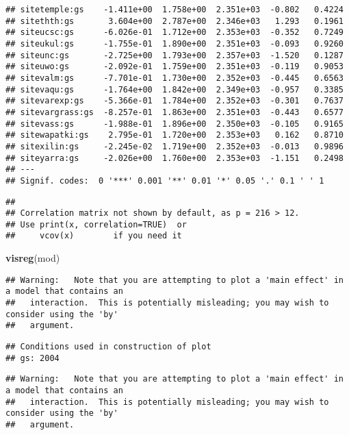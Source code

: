 \documentclass[
]{article}
\newenvironment{Shaded}{\begin{snugshade}}{\end{snugshade}}
\newcommand{\KeywordTok}[1]{\textcolor[rgb]{0.13,0.29,0.53}{\textbf{#1}}}
\newcommand{\NormalTok}[1]{#1}
\begin{document}
\begin{verbatim}
## sitetemple:gs    -1.411e+00  1.758e+00  2.351e+03  -0.802   0.4224  
## sitethth:gs       3.604e+00  2.787e+00  2.346e+03   1.293   0.1961  
## siteucsc:gs      -6.026e-01  1.712e+00  2.353e+03  -0.352   0.7249  
## siteukul:gs      -1.755e-01  1.890e+00  2.351e+03  -0.093   0.9260  
## siteunc:gs       -2.725e+00  1.793e+00  2.357e+03  -1.520   0.1287  
## siteuwo:gs       -2.092e-01  1.759e+00  2.351e+03  -0.119   0.9053  
## sitevalm:gs      -7.701e-01  1.730e+00  2.352e+03  -0.445   0.6563  
## sitevaqu:gs      -1.764e+00  1.842e+00  2.349e+03  -0.957   0.3385  
## sitevarexp:gs    -5.366e-01  1.784e+00  2.352e+03  -0.301   0.7637  
## sitevargrass:gs  -8.257e-01  1.863e+00  2.351e+03  -0.443   0.6577  
## sitevass:gs      -1.988e-01  1.896e+00  2.350e+03  -0.105   0.9165  
## sitewapatki:gs    2.795e-01  1.720e+00  2.353e+03   0.162   0.8710  
## sitexilin:gs     -2.245e-02  1.719e+00  2.352e+03  -0.013   0.9896  
## siteyarra:gs     -2.026e+00  1.760e+00  2.353e+03  -1.151   0.2498  
## ---
## Signif. codes:  0 '***' 0.001 '**' 0.01 '*' 0.05 '.' 0.1 ' ' 1
\end{verbatim}

\begin{verbatim}
## 
## Correlation matrix not shown by default, as p = 216 > 12.
## Use print(x, correlation=TRUE)  or
##     vcov(x)        if you need it
\end{verbatim}

\begin{Shaded}
\begin{Highlighting}[]
\KeywordTok{visreg}\NormalTok{(mod)}
\end{Highlighting}
\end{Shaded}

\begin{verbatim}
## Warning:   Note that you are attempting to plot a 'main effect' in a model that contains an
##   interaction.  This is potentially misleading; you may wish to consider using the 'by'
##   argument.
\end{verbatim}

\begin{verbatim}
## Conditions used in construction of plot
## gs: 2004
\end{verbatim}

\begin{verbatim}
## Warning:   Note that you are attempting to plot a 'main effect' in a model that contains an
##   interaction.  This is potentially misleading; you may wish to consider using the 'by'
##   argument.
\end{verbatim}
\end{document}
